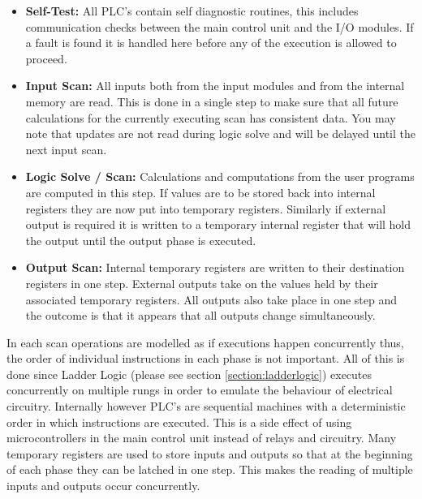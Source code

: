 \begin{itemize}
	\item\textbf{Self-Test:} All PLC's contain self diagnostic routines, this includes communication checks between the main control unit and the I/O modules. If a fault is found it is handled here before any of the execution is allowed to proceed.
	\item\textbf{Input Scan:} All inputs both from the input modules and from the internal memory are read. This is done in a single step to make sure that all future calculations for the currently executing scan has consistent data. You may note that updates are not read during logic solve and will be delayed until the next input scan.
	\item\textbf{Logic Solve / Scan:} Calculations and computations from the user programs are computed in this step. If values are to be stored back into internal registers they are now put into temporary registers. Similarly if external output is required it is written to a temporary internal register that will hold the output until the output phase is executed.
	\item\textbf{Output Scan:} Internal temporary registers are written to their destination registers in one step. External outputs take on the values held by their associated temporary registers. All outputs also take place in one step and the outcome is that it appears that all outputs change simultaneously.
\end{itemize}

In each scan operations are modelled as if executions happen concurrently thus, the order of individual instructions in each phase is not important. All of this is done since Ladder Logic (please see section \ref{section:ladderlogic}) executes concurrently on multiple rungs in order to emulate the behaviour of electrical circuitry. Internally however PLC's are sequential machines with a deterministic order in which instructions are executed. This is a side effect of using microcontrollers in the main control unit instead of relays and circuitry. Many temporary registers are used to store inputs and outputs so that at the beginning of each phase they can be latched in one step. This makes the reading of multiple inputs and outputs occur concurrently.

